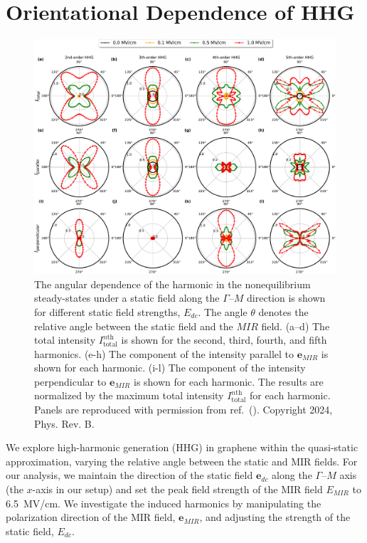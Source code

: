 \section{Orientational Dependence of HHG}
\begin{figure}[tp]
	\centering
	\includegraphics[width=1.0\linewidth]{pic/polar.pdf}
	\caption{\label{fig:polar}
		The angular dependence of the harmonic  in the nonequilibrium steady-states under a static field along the $\Gamma$--$M$ direction is shown for different static field strengths, $E_{dc}$. The angle $\theta$ denotes the relative angle between the static field and the $MIR$ field. (a--d) The total intensity $I^{n \textrm{th}}_{\mathrm{total}}$ is shown for the second, third, fourth, and fifth harmonics. (e-h) The component of the intensity parallel to $\mathbf e_{MIR}$ is shown for each harmonic. (i-l) The component of the intensity perpendicular to $\mathbf e_{MIR}$ is shown for each harmonic. The results are normalized by the maximum total intensity $I^{n \textrm{th}}_{\mathrm{total}}$ for each harmonic. Panels are reproduced with permission from ref.~(\cite{PhysRevB.109.045421}). Copyright 2024, Phys. Rev. B.
	}
\end{figure}

We explore high-harmonic generation (HHG) in graphene within the quasi-static approximation, varying the relative angle between the static and MIR fields. For our analysis, we maintain the direction of the static field $\mathbf e_{dc}$ along the $\Gamma$--$M$ axis (the $x$-axis in our setup) and set the peak field strength of the MIR field $E_{MIR}$ to 6.5~MV/cm. We investigate the induced harmonics by manipulating the polarization direction of the MIR field, $\mathbf e_{MIR}$, and adjusting the strength of the static field, $E_{dc}$.

